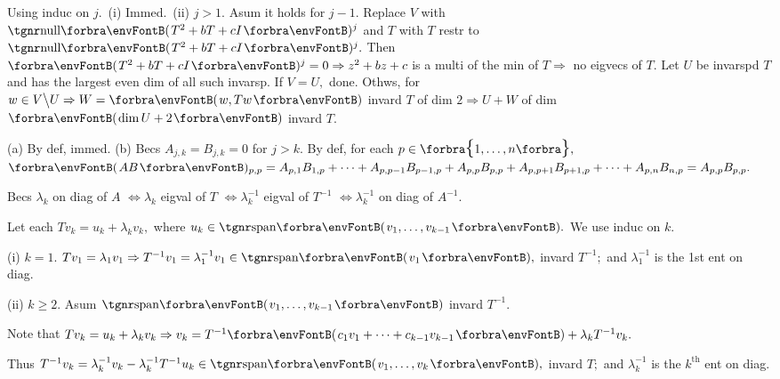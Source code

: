 Using induc on $j.$ \,(i) Immed. \,(ii) $j>1.$ Asum it holds for $j-1.$\parSol{}
Replace $V$ with $\Null\Par{T^2+bT+cI}{^{j}}$ and $T$ with $T$ restr to $\Null\Par{T^2+bT+cI}{^{j}}.$\parSol{}
Then $\Par{T^2+bT+cI}{^{j}}=0\Rightarrow z^2+bz+c$ is a multi of the min of $T\Rightarrow$ no eigvecs of $T.$\parSol{}
Let $U$ be invarspd $T$ and has the largest even dim of all such invarsp. If $V=U,$ done. Othws,\parSol{}
for $w\in V\Backslash U\Rightarrow W=\Par{w,Tw}$ invard $T$ of dim $2\Rightarrow U+W$ of dim $\Par{{\dim U+2}}$ invard $T.$\PfEnd
\SepLine

\pagebreak


\vspace{4pt}

(a) By def, immed. \:(b) Becs $A_{j,k}=B_{j,k}=0$ for $j>k.$ By def, for each $p\in\Bra{1,\dots,n},$\parSol{} $\Par{AB}{_{p,p}}=A_{p,1}B_{1,p}+\dots+A_{p,p-1}B_{p-1,p}+A_{p,p}B_{p,p}+A_{p,p+1}B_{p+1,p}+\dots+A_{p,n}B_{n,p}=A_{p,p}B_{p,p}.$\PfEnd
\SepLine

Becs $\lambda_k$ on diag of $A$ $\Longleftrightarrow\lambda_k$ eigval of $T$ $\Longleftrightarrow\lambda_k^{-1}$ eigval of $T^{-1}$ $\Longleftrightarrow\lambda_k^{-1}$ on diag of $A^{-1}.$\PfEnd\vspace{2pt}\par\quad
\Or Let each $Tv_k=u_k+\lambda_kv_k,$ where $u_k\in\Span{v_1,\dots,v_{k-1}}.$ We use induc on $k.$\par\quad
(i) $k=1.$ $Tv_1=\lambda_1v_1\Rightarrow T^{-1}v_1=\lambda_1^{-1}v_1\in\Span{v_1},$ invard $T^{-1};$ and $\lambda_1^{-1}$ is the 1st ent on diag.\par\quad\Endi
(ii) $k\geqslant 2.$ Asum $\Span{v_1,\dots,v_{k-1}}$ invard $T^{-1}.$\par\quad\Hii
Note that $Tv_k=u_k+\lambda_kv_k\Rightarrow v_k=T^{-1}\Par{c_1v_1+\dots+c_{k-1}v_{k-1}}+\lambda_kT^{-1}v_k.$\par\quad\Hii
Thus $T^{-1}v_k=\lambda_k^{-1}v_k-\lambda_k^{-1}T^{-1}u_k\in\Span{v_1,\dots,v_k},$ invard $T;$ and $\lambda_{k}^{-1}$ is the $k^\text{th}$ ent on diag.\PfEnd
\SepLine

